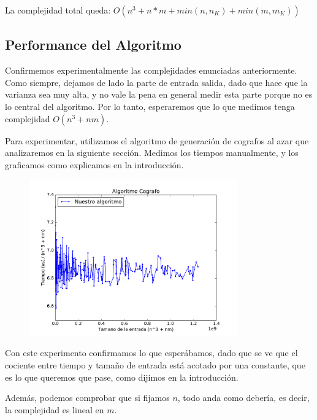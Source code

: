 La complejidad total queda: 
$O( n^3 + n*m + min( n, n_K) + min (m, m_K) )$

\subsection{Performance del Algoritmo}

Confirmemos experimentalmente las complejidades enunciadas anteriormente. Como siempre, dejamos de lado la parte de entrada salida, dado que hace que la varianza sea muy alta, y no vale la pena en general medir esta parte porque no es lo central del algoritmo. Por lo tanto, esperaremos que lo que medimos tenga complejidad $O(n^3 + nm)$. 

Para experimentar, utilizamos el algoritmo de generación de cografos al azar que analizaremos en la siguiente sección. Medimos los tiempos manualmente, y los graficamos como explicamos en la introducción. 

\begin{figure}[H]
 \centering
	\includegraphics[width=0.8\textwidth]{graficos/problema_3/tiempos0.pdf}
	\caption{}
	\label{fig:problema3-tiempos0}
\end{figure}

Con este experimento confirmamos lo que esperábamos, dado que se ve que el cociente entre tiempo y tamaño de entrada está acotado por una constante, que es lo que queremos que pase, como dijimos en la introducción.

Además, podemos comprobar que si fijamos $n$, todo anda como debería, es decir, la complejidad es lineal en $m$.

